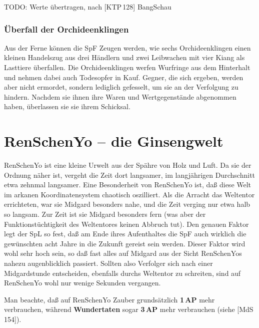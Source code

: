\documentclass[
a4paper,
twoside,
DIV=calc,
BCOR=4mm,
fontsize=9pt,
twocolumn=on,
titlepage=on,
parskip=half
]{scrartcl}
\begin{document}
TODO: Werte übertragen, nach [KTP\,128] BangSchau

\subsubsection{Überfall der Orchideenklingen}

Aus der Ferne können die SpF Zeugen werden, wie sechs Orchideenklingen
einen kleinen Handelszug aus drei Händlern und zwei Leibwachen mit
vier Kiang als Lasttiere überfallen. Die Orchideenklingen werfen
Wurfringe aus dem Hinterhalt und nehmen dabei auch Todesopfer in
Kauf. Gegner, die sich ergeben, werden aber nicht ermordet, sondern
lediglich gefesselt, um sie an der Verfolgung zu hindern. Nachdem sie
ihnen ihre Waren und Wertgegenstände abgenommen haben, überlassen sie
sie ihrem Schicksal.

\section{RenSchenYo -- die Ginsengwelt}

RenSchenYo ist eine kleine Urwelt aus der Spähre von Holz und Luft. Da
sie der Ordnung näher ist, vergeht die Zeit dort langsamer, im
langjährigen Durchschnitt etwa zehnmal langsamer. Eine Besonderheit
von RenSchenYo ist, daß diese Welt im arkanen Koordinatensystem
chaotisch oszilliert. Als die Arracht das Weltentor errichteten, war
sie Midgard besonders nahe, und die Zeit verging nur etwa halb so
langsam. Zur Zeit ist sie Midgard besonders fern (was aber der
Funktionstüchtigkeit des Weltentores keinen Abbruch tut). Den genauen
Faktor legt der SpL so fest, daß am Ende ihres Aufenthaltes die SpF
auch wirklich die gewünschten acht Jahre in die Zukunft gereist sein
werden. Dieser Faktor wird wohl sehr hoch sein, so daß fast alles auf
Midgard aus der Sicht RenSchenYos nahezu augenblicklich
passiert. Sollten also Verfolger sich nach einer Midgardstunde
entscheiden, ebenfalls durchs Weltentor zu schreiten, sind auf
RenSchenYo wohl nur wenige Sekunden vergangen.

Man beachte, daß auf RenSchenYo Zauber grundsätzlich \textbf{1\,AP}
mehr verbrauchen, während \textbf{Wundertaten} sogar \textbf{3\,AP}
mehr verbrauchen (siehe [MdS\,154]).
\end{document}
